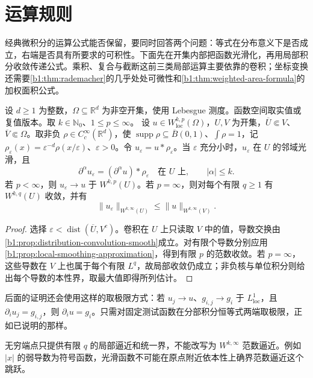 \section{运算规则}
\label{b1:sec:2103}

经典微积分的运算公式能否保留，要同时回答两个问题：等式在分布意义下是否成立，右端是否具有所要求的可积性。下面先在开集内部把函数光滑化，再用局部积分收敛传递公式。乘积、复合与截断这前三类局部运算主要依靠的卷积；坐标变换还需要\cref{b1:thm:rademacher}的几乎处处可微性和\cref{b1:thm:weighted-area-formula}的加权面积公式。

\begin{lemma}\label{b1:lem:sobolev-local-smoothing}
设 \(d\geq1\) 为整数，\(\Omega\subseteq\mathbb R^d\) 为非空开集，使用 Lebesgue 测度。函数空间取实值或复值版本。取 \(k\in\mathbb N_0\)、\(1\leq p\leq\infty\)。
设 \(u\in W^{k,p}_{\mathrm{loc}}(\Omega)\)，\(U,V\) 为开集，\(\overline U\Subset V\)、\(\overline V\Subset\Omega\)。取非负 \(\rho\in C_c^\infty(\mathbb R^d)\)，使 \(\operatorname{supp}\rho\subseteq\overline B(0,1)\)、\(\int\rho=1\)，记 \(\rho_\varepsilon(x)=\varepsilon^{-d}\rho(x/\varepsilon)\)、\(\varepsilon>0\)。令 \(u_\varepsilon=u*\rho_\varepsilon\)。当 \(\varepsilon\) 充分小时，\(u_\varepsilon\) 在 \(U\) 的邻域光滑，且
\[
 \partial^\alpha u_\varepsilon
   =(\partial^\alpha u)*\rho_\varepsilon
 \quad\text{在 }U\text{ 上},\qquad |\alpha|\le k.
\]
若 \(p<\infty\)，则 \(u_\varepsilon\to u\) 于 \(W^{k,p}(U)\)。若 \(p=\infty\)，则对每个有限 \(q\ge1\) 有 \(W^{k,q}(U)\) 收敛，并有
\[
 \|u_\varepsilon\|_{W^{k,\infty}(U)}
 \le\|u\|_{W^{k,\infty}(V)}.
\]
\end{lemma}
\begin{proof}
选择 \(\varepsilon<\operatorname{dist}(\overline U,V^c)\)。卷积在 \(U\) 上只读取 \(V\) 中的值，导数交换由\cref{b1:prop:distribution-convolution-smooth}成立。对有限个导数分别应用\cref{b1:prop:local-smoothing-approximation}，得到有限 \(p\) 的范数收敛。若 \(p=\infty\)，这些导数在 \(V\) 上也属于每个有限 \(L^q\)，故局部收敛仍成立；非负核与单位积分则给出每个导数的本性界，取最大值即得所列估计。
\end{proof}

后面的证明还会使用这样的取极限方式：若 \(u_j\to u\)、\(g_{i,j}\to g_i\) 于 \(L^1_{\mathrm{loc}}\)，且 \(\partial_i u_j=g_{i,j}\)，则 \(\partial_i u=g_i\)。只需对固定测试函数在分部积分恒等式两端取极限，正如已说明的那样。

\ProseParagraphBreak

无穷端点只提供有限 \(q\) 的局部逼近和统一界，不能改写为 \(W^{k,\infty}\) 范数逼近。例如 \(|x|\) 的弱导数为符号函数，光滑函数不可能在原点附近依本性上确界范数逼近这个跳跃。

